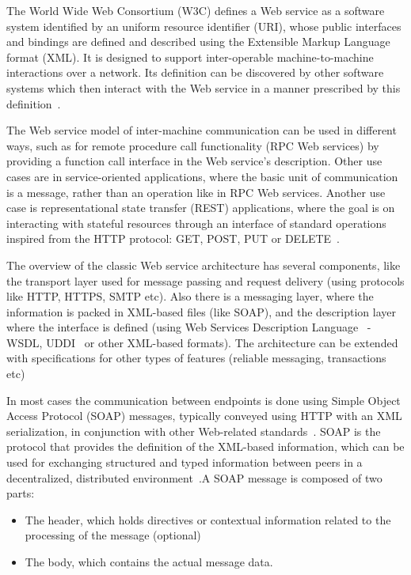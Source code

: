 
The World Wide Web Consortium (W3C) defines a Web service as a software system identified by an uniform resource identifier (URI), whose public interfaces and bindings are defined and described using the Extensible Markup Language format (XML). It is designed to support inter-operable machine-to-machine interactions over a network. Its definition can be discovered by other software systems which then interact with the Web service in a manner prescribed by this definition~\cite{w3c-wsa-reqs}.

The Web service model of inter-machine communication can be used in different ways, such as for remote procedure call functionality (RPC Web services) by providing a function call interface in the Web service's description. Other use cases are in service-oriented applications, where the basic unit of communication is a message, rather than an operation like in RPC Web services. Another use case is representational state transfer (REST) applications, where the goal is on interacting with stateful resources through an interface of standard operations inspired from the HTTP protocol: GET, POST, PUT or DELETE~\cite{wiki-ws}.

The overview of the classic Web service architecture has several components, like the transport layer used for message passing and request delivery (using protocols like HTTP, HTTPS, SMTP etc). Also there is a messaging layer, where the information is packed in XML-based files (like SOAP), and the description layer where the interface is defined (using Web Services Description Language~\cite{wiki-wsdl} - WSDL, UDDI~\cite{wiki-uddi} or other XML-based formats). The architecture can be extended with specifications for other types of features (reliable messaging, transactions etc)

In most cases the communication between endpoints is done using Simple Object Access Protocol (SOAP) messages, typically conveyed using HTTP with an XML serialization, in conjunction with other Web-related standards~\cite{w3c-ws-gloss}. SOAP is the protocol that provides the definition of the XML-based information, which can be used for exchanging structured and typed information between peers in a decentralized, distributed environment~\cite{ws-intro}.A SOAP message is composed of two parts: 
\begin{itemize}
 \item The header, which holds directives or contextual information related to the processing of the message (optional)
 \item The body, which contains the actual message data.
\end{itemize}



% 
% 
% 
